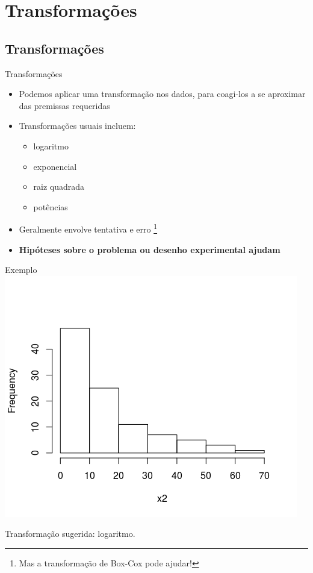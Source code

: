 \documentclass{beamer}
\begin{document}
\section{Transformações}

\subsection{Transformações}

\begin{frame}{\scriptsize Transformações}
  \begin{itemize}
    \footnotesize
  \item Podemos aplicar uma transformação nos dados, para coagi-los a se aproximar das premissas requeridas
    \bigskip
  \item Transformações usuais incluem:
    \begin{itemize}
      \scriptsize
    \item logaritmo
    \item exponencial
    \item raiz quadrada
    \item potências
    \end{itemize}
    \bigskip
  \item Geralmente envolve tentativa e erro \footnote{\tiny Mas a transformação de Box-Cox pode ajudar!}
    \bigskip
    \footnotesize
  \item {\bf Hipóteses sobre o problema ou desenho experimental ajudam}
  \end{itemize}
\end{frame}


\begin{frame}{\scriptsize Exemplo}
  \centering
  \includegraphics[width=.8\textwidth]{Cap37-38/lognormal1-h}

  \footnotesize
Transformação sugerida: logaritmo.
\end{frame}
\end{document}
